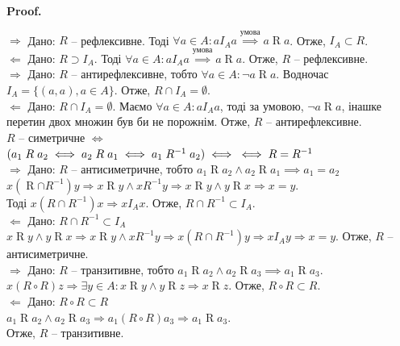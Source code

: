 \documentclass[a4paper, 14pt]{extarticle}
\makeatletter
\def\rightproof{$\boxed{\Rightarrow}$ }
\def\leftproof{$\boxed{\Leftarrow}$ }
\theoremstyle{theoremdd}
\theoremstyle{theoremdd}
\theoremstyle{theoremdd}
\theoremstyle{theoremdd}
\theoremstyle{theoremdd}
\theoremstyle{theoremdd}
\theoremstyle{theoremdd}
\theoremstyle{theoremdd}
\theoremstyle{theoremdd}
\theoremstyle{theoremdd}
\theoremstyle{theoremdd}
\theoremstyle{theoremdd}
\theoremstyle{theoremdd}
\theoremstyle{theoremdd}
\theoremstyle{theoremdd}
\renewenvironment{proof}[1][Proof.\\]{\par
\pushQED{\hfill \qed}%
\normalfont \topsep6\p@\@plus6\p@\relax
\trivlist
\item\relax
{\bfseries
#1\@addpunct{.}}\hspace\labelsep\ignorespaces
}{%
\popQED\endtrivlist\@endpefalse
}
\makeatother
\begin{document}
\begin{proof}
\rightproof Дано: $R$ -- рефлексивне. Тоді $\forall a \in A: a \mathrel{I_A} a \overset{\text{умова}}{\implies} a \mathrel{R} a$. Отже, $I_A \subset R$.\\
\leftproof Дано: $R \supset I_A$. Тоді $\forall a \in A: aI_Aa \overset{\text{умова}}{\implies} a \mathrel{R} a$. Отже, $R$ -- рефлексивне.
\bigskip \\
\rightproof Дано: $R$ -- антирефлексивне, тобто $\forall a \in A: \neg a \mathrel{R}a$. Водночас $I_A = \{(a,a), a \in A \}$. Отже, $R \cap I_A = \emptyset$.\\
\leftproof Дано: $R \cap I_A = \emptyset$. Маємо $\forall a \in A: a \mathrel{I_A} a$, тоді за умовою, $\neg a \mathrel{R} a$, інашке перетин двох множин був би не порожнім. Отже, $R$ -- антирефлексивне.
\bigskip \\
$R$ -- симетричне $\iff$
$(a_1 \mathrel{R} a_2 \iff a_2 \mathrel{R} a_1 \iff a_1 \mathrel{R^{-1}} a_2) \iff \\ \iff R = R^{-1}$
\bigskip \\
\rightproof Дано: $R$ -- антисиметричне, тобто $a_1 \mathrel{R} a_2 \wedge a_2 \mathrel{R} a_1 \implies a_1 = a_2$\\
$x(\mathrel{R} \cap \mathrel{R^{-1}})y \Rightarrow x \mathrel{R} y \wedge x\mathrel{R^{-1}} y \Rightarrow x \mathrel{R} y \wedge y \mathrel{R} x \Rightarrow x=y$.\\
Тоді $x \mathrel{(R \cap R^{-1})} x \Rightarrow x \mathrel{I_A} x$. Отже, $R \cap R^{-1} \subset I_A$.\\
\leftproof Дано: $R \cap R^{-1} \subset I_A$\\
$x \mathrel{R} y \wedge y \mathrel{R} x \Rightarrow x \mathrel{R} y \wedge x \mathrel{R^{-1}} y \Rightarrow x\mathrel{(R \cap R^{-1})}y \Rightarrow x\mathrel{I_A} y \Rightarrow x = y$.
Отже, $R$ -- антисиметричне.
\bigskip \\
\rightproof Дано: $R$ -- транзитивне, тобто $a_1 \mathrel{R} a_2 \wedge a_2 \mathrel{R} a_3 \implies a_1 \mathrel{R} a_3$.\\
$x \mathrel{(R \circ R)} z \Rightarrow \exists y \in A: x \mathrel{R} y \wedge y \mathrel{R} z \Rightarrow x \mathrel{R} z$. Отже, $R \circ R \subset R$.\\
\leftproof Дано: $R \circ R \subset R$\\
$a_1 \mathrel{R} a_2 \wedge a_2 \mathrel{R} a_3 \Rightarrow a_1 \mathrel{(R \circ R)} a_3 \Rightarrow a_1 \mathrel{R} a_3$. \\
Отже, $R$ -- транзитивне.
\end{proof}
\end{document}
